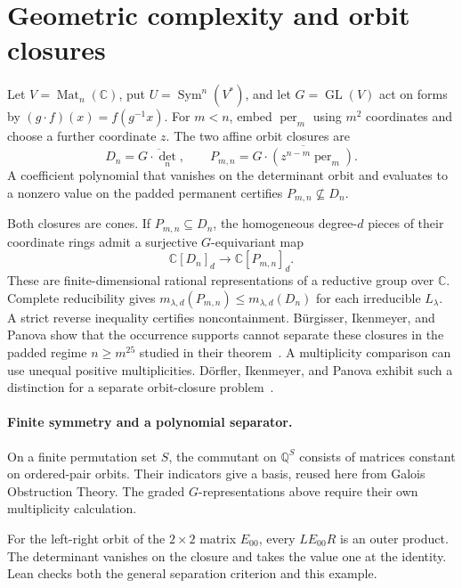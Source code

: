 \section{Geometric complexity and orbit closures}
\label{sec:gct}

Let \(V=\operatorname{Mat}_n(\mathbb C)\), put
\(U=\operatorname{Sym}^n(V^*)\), and let \(G=\operatorname{GL}(V)\)
act on forms by \((g\cdot f)(x)=f(g^{-1}x)\). For \(m<n\), embed
\(\operatorname{per}_m\) using \(m^2\) coordinates and choose a further
coordinate \(z\). The two affine orbit closures are
\begin{equation*}
  D_n=\overline{G\cdot\det_n},\qquad
  P_{m,n}=\overline{G\cdot(z^{n-m}\operatorname{per}_m)}.
\end{equation*}
A coefficient polynomial that vanishes on the determinant orbit and
evaluates to a nonzero value on the padded permanent certifies
\(P_{m,n}\nsubseteq D_n\).

Both closures are cones. If \(P_{m,n}\subseteq D_n\), the homogeneous
degree-\(d\) pieces of their
coordinate rings admit a surjective \(G\)-equivariant map
\begin{equation*}
  \mathbb C[D_n]_d \longrightarrow \mathbb C[P_{m,n}]_d.
\end{equation*}
These are finite-dimensional rational representations of a reductive
group over \(\mathbb C\). Complete reducibility gives
\(m_{\lambda,d}(P_{m,n})\le m_{\lambda,d}(D_n)\) for each irreducible
\(L_\lambda\). A strict reverse inequality certifies noncontainment.
B\"urgisser, Ikenmeyer, and Panova show that the occurrence supports cannot
separate these closures in the padded regime \(n\ge m^{25}\) studied in
their theorem~\cite{gctnooccurrence}. A multiplicity comparison can use
unequal positive multiplicities. D\"orfler, Ikenmeyer, and Panova exhibit
such a distinction for a separate orbit-closure problem~\cite{gctmultiplicity}.

\paragraph{Finite symmetry and a polynomial separator.}
On a finite permutation set \(S\), the commutant on \(\mathbb Q^S\)
consists of matrices constant on ordered-pair orbits. Their indicators
give a basis, reused here from Galois Obstruction Theory. The graded
\(G\)-representations above require their own multiplicity calculation.

For the left-right orbit of the \(2\times2\) matrix \(E_{00}\), every
\(LE_{00}R\) is an outer product. The determinant vanishes on the closure
and takes the value one at the identity. Lean checks both the general
separation criterion and this example.

